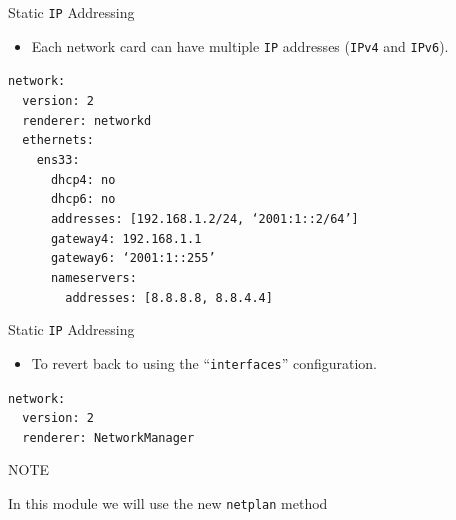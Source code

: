 \documentclass[aspectratio=169]{beamer}
\begin{document}
\begin{frame}{Static \texttt{IP} Addressing}
  \begin{itemize}
    \item Each network card can have multiple \texttt{IP} addresses (\texttt{IPv4} and \texttt{IPv6}).
  \end{itemize}
  \begin{center}
    \begin{minipage}{10cm}
      \begin{block}{}
        \texttt{network:\\
        ~~version: 2\\
        ~~renderer: networkd\\
        ~~ethernets:\\
        ~~~~ens33:\\
        ~~~~~~dhcp4: no\\
        ~~~~~~dhcp6: no\\
        ~~~~~~addresses: [192.168.1.2/24, `2001:1::2/64']\\
        ~~~~~~gateway4: 192.168.1.1\\
        ~~~~~~gateway6: `2001:1::255'\\
        ~~~~~~nameservers:\\
        ~~~~~~~~addresses: [8.8.8.8, 8.8.4.4]}
      \end{block}
    \end{minipage}
  \end{center}
\end{frame}

\begin{frame}{Static \texttt{IP} Addressing}
  \begin{itemize}
    \item To revert back to using the ``\texttt{interfaces}'' configuration.
  \end{itemize}
  \begin{center}
    \begin{minipage}{10cm}
      \begin{block}{}
        \texttt{network:\\
        ~~version: 2\\
        ~~renderer: NetworkManager\\}
      \end{block}
    \end{minipage}
  \end{center}
  \begin{block}{NOTE}
    \begin{center}
      In this module we will use the new \texttt{netplan} method      
    \end{center}
  \end{block}
\end{frame}
\end{document}

